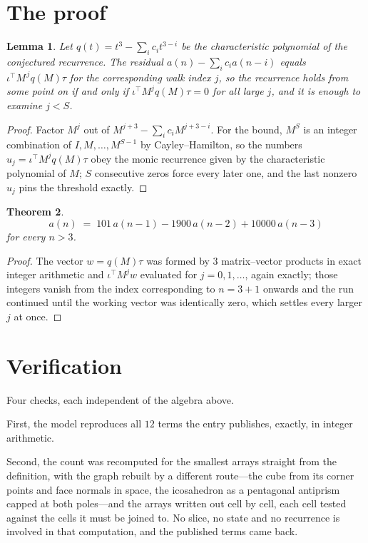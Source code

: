 \documentclass[11pt,a4paper]{article}
\theoremstyle{plain}
\newtheorem{theorem}{Theorem}
\newtheorem{lemma}[theorem]{Lemma}
\theoremstyle{definition}
\begin{document}
\section{The proof}

\begin{lemma}\label{lem:crit}
Let $q(t)=t^{3}-\sum_i c_it^{3-i}$ be the characteristic polynomial of the
conjectured recurrence. The residual $a(n)-\sum_ic_ia(n-i)$ equals
$\iota^{\!\top}M^{\,j}q(M)\tau$ for the corresponding walk index $j$, so the recurrence
holds from some point on if and only if $\iota^{\!\top}M^{j}q(M)\tau=0$ for all large $j$,
and it is enough to examine $j<S$.
\end{lemma}

\begin{proof}
Factor $M^{j}$ out of $M^{j+3}-\sum_ic_iM^{j+3-i}$. For the bound, $M^{S}$
is an integer combination of $I,M,\dots,M^{S-1}$ by Cayley--Hamilton, so the numbers
$u_j=\iota^{\!\top}M^{j}q(M)\tau$ obey the monic recurrence given by the characteristic
polynomial of $M$; $S$ consecutive zeros force every later one, and the last nonzero $u_j$
pins the threshold exactly.
\end{proof}

\begin{theorem}
\[
a(n)\;=\;101\,a(n-1) - 1900\,a(n-2) + 10000\,a(n-3)
\]
for every $n>3$.
\end{theorem}

\begin{proof}
The vector $w=q(M)\tau$ was formed by $3$ matrix--vector products in exact integer
arithmetic and $\iota^{\!\top}M^{j}w$ evaluated for $j=0,1,\dots$, again exactly; those
integers vanish from the index corresponding to $n=3+1$ onwards and the run continued
until the working vector was identically zero, which settles every larger $j$ at once.
\end{proof}

\section{Verification}

Four checks, each independent of the algebra above.

First, the model reproduces all $12$ terms the entry publishes, exactly, in integer
arithmetic.

Second, the count was recomputed for the smallest arrays straight from the definition, with the
graph rebuilt by a different route---the cube from its corner points and face normals in space,
the icosahedron as a pentagonal antiprism capped at both poles---and the arrays written out cell
by cell, each cell tested against the cells it must be joined to. No slice, no state and no
recurrence is involved in that computation, and the published terms came back.
\end{document}
